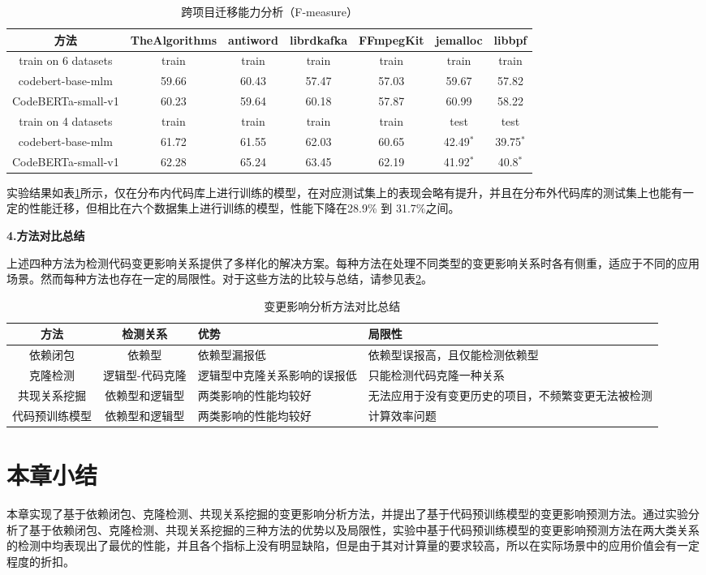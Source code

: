 \begin{table}[htbp]
\caption{跨项目迁移能力分析（F-measure）}
\label{1_跨项目迁移能力分析}
\vspace{0.5em}\centering\wuhao
\begin{tabular}{c|cccc|cc}
\toprule
方法& TheAlgorithms & antiword & librdkafka & FFmpegKit & jemalloc & libbpf\\
\midrule
train on 6 datasets & train & train & train & train & train & train \\
\midrule
codebert-base-mlm &  59.66 & 60.43 & 57.47 & 57.03 & 59.67 & 57.82\\
CodeBERTa-small-v1 &  60.23 & 59.64 & 60.18 & 57.87 & 60.99 & 58.22\\
\midrule
train on 4 datasets & train & train & train & train & test & test \\
\midrule
codebert-base-mlm &   61.72 & 61.55 & 62.03 & 60.65 & 42.49$^*$ & 39.75$^*$ \\
CodeBERTa-small-v1 &  62.28 & 65.24 & 63.45 & 62.19 & 41.92$^*$ & 40.8$^*$\\
\bottomrule
\end{tabular}
\end{table}

实验结果如表\ref{1_跨项目迁移能力分析}所示，仅在分布内代码库上进行训练的模型，在对应测试集上的表现会略有提升，并且在分布外代码库的测试集上也能有一定的性能迁移，但相比在六个数据集上进行训练的模型，性能下降在28.9\% 到 31.7\%之间。

\textbf{4.方法对比总结}

上述四种方法为检测代码变更影响关系提供了多样化的解决方案。每种方法在处理不同类型的变更影响关系时各有侧重，适应于不同的应用场景。然而每种方法也存在一定的局限性。对于这些方法的比较与总结，请参见表\ref{1_变更影响分析方法对比总结}。


\begin{table}[htbp]
\caption{变更影响分析方法对比总结}
\label{1_变更影响分析方法对比总结}
\vspace{0.5em}\centering\wuhao
\begin{tabular}{c|c|p{4cm}|p{4cm}}
\toprule
方法& 检测关系 & 优势 & 局限性\\
\midrule
依赖闭包 & 依赖型 & 依赖型漏报低 & 依赖型误报高，且仅能检测依赖型\\
\midrule
克隆检测 & 逻辑型-代码克隆 & 逻辑型中克隆关系影响的误报低 & 只能检测代码克隆一种关系\\
\midrule
共现关系挖掘  & 依赖型和逻辑型 & 两类影响的性能均较好 & 无法应用于没有变更历史的项目，不频繁变更无法被检测 \\
\midrule
代码预训练模型  & 依赖型和逻辑型 & 两类影响的性能均较好 & 计算效率问题 \\
\bottomrule
\end{tabular}
\end{table}



\section{本章小结}

本章实现了基于依赖闭包、克隆检测、共现关系挖掘的变更影响分析方法，并提出了基于代码预训练模型的变更影响预测方法。通过实验分析了基于依赖闭包、克隆检测、共现关系挖掘的三种方法的优势以及局限性，实验中基于代码预训练模型的变更影响预测方法在两大类关系的检测中均表现出了最优的性能，并且各个指标上没有明显缺陷，但是由于其对计算量的要求较高，所以在实际场景中的应用价值会有一定程度的折扣。

